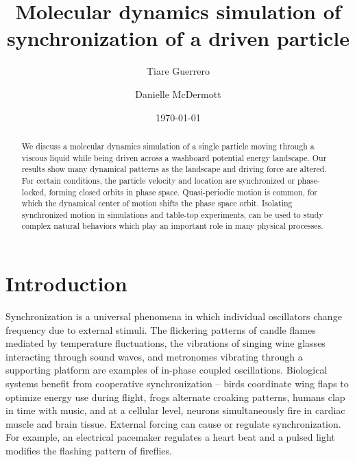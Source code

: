 \documentclass[preprint,showpacs,preprintnumbers,amsmath,amssymb,aps,prb]{revtex4-1}
\theoremstyle{remark}
\begin{document}
\title{Molecular dynamics simulation of synchronization of a  driven particle}
 
\author{Tiare Guerrero}

\author{Danielle McDermott}

\date{\today}

\begin{abstract}
  We discuss a 
  molecular dynamics simulation
  of a single particle
  moving through
  a viscous liquid
  while being driven 
  across a washboard potential energy landscape.
  Our results show many dynamical patterns
  as the landscape and driving force are altered.
  For certain conditions,
  the particle velocity and location
  are synchronized or 
  phase-locked,
  forming closed orbits in phase space.
  Quasi-periodic motion is common, 
  for which the
  dynamical center of motion shifts the
  phase space orbit.
  Isolating
  synchronized motion
  in 
  simulations and table-top experiments,
  can be used to study %
  complex natural behaviors
  which
  play an important role in many physical processes.
\end{abstract}

\maketitle 

\section{Introduction} 
Synchronization is a universal phenomena
in which
individual oscillators change frequency due
to external stimuli.\cite{Pikovsky2003}
The
flickering patterns of
candle flames 
mediated by temperature fluctuations,\cite{Okamoto2016}
the vibrations of singing wine glasses interacting 
through sound waves,\cite{Arane2009}
and metronomes vibrating through a supporting platform\cite{Jia2015}
are examples of in-phase coupled oscillations. 
Biological systems benefit from cooperative
synchronization --
birds  coordinate wing flaps
to optimize energy use during flight,\cite{Portugal2014}
frogs alternate croaking patterns,\cite{Aihara2014}
humans clap in time with music,\cite{Tranchant2016}
and 
at a cellular level, 
neurons simultaneously fire in cardiac muscle\cite{MartinHall1999}
and brain tissue.\cite{Singer1999}
%
External forcing
can cause or regulate synchronization.
For example, 
an electrical pacemaker 
regulates a heart beat and
a pulsed light modifies the
flashing pattern of fireflies.
\end{document}

